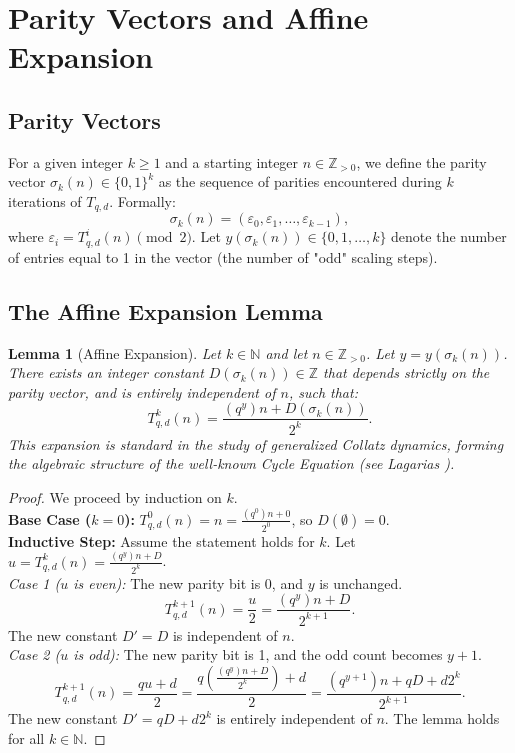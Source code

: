 \documentclass[11pt]{article}
\newtheorem{lemma}[theorem]{Lemma}
\begin{document}
\section{Parity Vectors and Affine Expansion}

\subsection{Parity Vectors}
For a given integer $k \ge 1$ and a starting integer $n \in \mathbb{Z}_{>0}$, we define the parity vector $\sigma_k(n) \in \{0, 1\}^k$ as the sequence of parities encountered during $k$ iterations of $T_{q,d}$. Formally:
\[
\sigma_k(n) = (\varepsilon_0, \varepsilon_1, \ldots, \varepsilon_{k-1}),
\]
where $\varepsilon_i = T_{q,d}^i(n) \pmod 2$. Let $y(\sigma_k(n)) \in \{0, 1, \ldots, k\}$ denote the number of entries equal to 1 in the vector (the number of "odd" scaling steps).

\subsection{The Affine Expansion Lemma}

\begin{lemma}[Affine Expansion] \label{lem:affine}
Let $k \in \mathbb{N}$ and let $n \in \mathbb{Z}_{>0}$. Let $y = y(\sigma_k(n))$. There exists an integer constant $D(\sigma_k(n)) \in \mathbb{Z}$ that depends strictly on the parity vector, and is entirely independent of $n$, such that:
\[
T_{q,d}^k(n) = \frac{(q^y)n + D(\sigma_k(n))}{2^k}.
\]
This expansion is standard in the study of generalized Collatz dynamics, forming the algebraic structure of the well-known Cycle Equation (see Lagarias \cite{Lagarias}).
\end{lemma}

\begin{proof}
We proceed by induction on $k$. \\

\noindent \textbf{Base Case ($k=0$):} $T_{q,d}^0(n) = n = \frac{(q^0)n + 0}{2^0}$, so $D(\emptyset) = 0$. \\

\noindent \textbf{Inductive Step:} Assume the statement holds for $k$. Let $u = T_{q,d}^k(n) = \frac{(q^y)n + D}{2^k}$. \\

\textit{Case 1 ($u$ is even):} The new parity bit is 0, and $y$ is unchanged. 
\[
T_{q,d}^{k+1}(n) = \frac{u}{2} = \frac{(q^y)n + D}{2^{k+1}}.
\]
The new constant $D' = D$ is independent of $n$. \\

\textit{Case 2 ($u$ is odd):} The new parity bit is 1, and the odd count becomes $y+1$. 
\[
T_{q,d}^{k+1}(n) = \frac{q u + d}{2} = \frac{q \left( \frac{(q^y)n + D}{2^k} \right) + d}{2} = \frac{(q^{y+1})n + qD + d2^k}{2^{k+1}}.
\]
The new constant $D' = qD + d2^k$ is entirely independent of $n$. The lemma holds for all $k \in \mathbb{N}$.
\end{proof}
\end{document}
